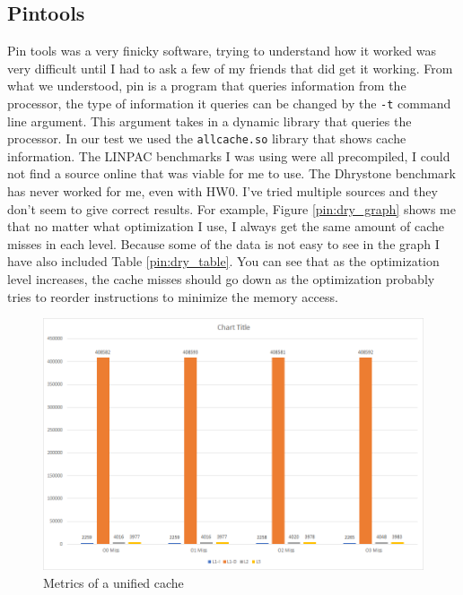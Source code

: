 \documentclass{article}
\begin{document}
    \subsection{Pintools}
        Pin tools was a very finicky software, trying to understand how it worked was very difficult until I had to ask a few of my friends that did get it working. From what we understood, pin is a program that queries information from the processor, the type of information it queries can be changed by the \verb|-t| command line argument. This argument takes in a dynamic library that queries the processor. In our test we used the \verb|allcache.so| library that shows cache information. The LINPAC benchmarks I was using were all precompiled, I could not find a source online that was viable for me to use. The Dhrystone benchmark has never worked for me, even with HW0. I’ve tried multiple sources and they don’t seem to give correct results. For example, Figure \ref{pin:dry_graph} shows me that no matter what optimization I use, I always get the same amount of cache misses in each level. Because some of the data is not easy to see in the graph I have also included Table \ref{pin:dry_table}. You can see that as the optimization level increases, the cache misses should go down as the optimization probably tries to reorder instructions to minimize the memory access.
        \begin{figure}[H]
            \label{fig:dry_graph}
            \begin{center}
                \includegraphics[width=\textwidth]{dry_graph.png}
                \caption{Metrics of a unified cache}
            \end{center}
        \end{figure}
\end{document}
